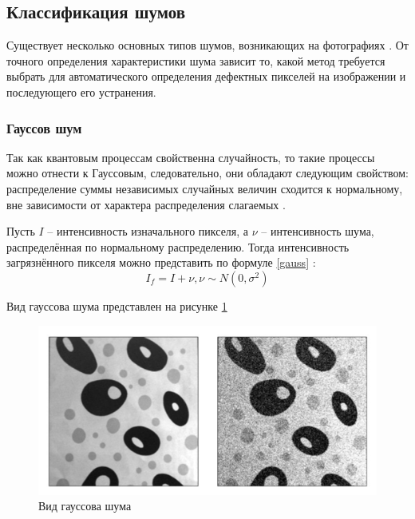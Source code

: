 \subsection{Классификация шумов}
Существует несколько основных типов шумов, возникающих на фотографиях \cite{filterTechincs}.
От точного определения характеристики шума зависит то, какой метод требуется выбрать для автоматического определения дефектных пикселей на изображении и последующего его устранения.

\subsubsection{Гауссов шум}
Так как квантовым процессам свойственна случайность, то такие процессы можно отнести к Гауссовым, следовательно, они обладают следующим свойством: распределение суммы независимых случайных величин сходится к нормальному, вне зависимости от характера распределения слагаемых \cite{inproceedings}.

Пусть $I$ -- интенсивность изначального пикселя, а $\nu$ -- интенсивность шума, распределённая по нормальному распределению. 
Тогда интенсивность загрязнённого пикселя можно представить по формуле \ref{gauss} \cite{filterTechincs}: 
\begin{equation}
	\label{gauss}
I_f = I + \nu,  \nu \sim N(0, \sigma^2)
\end{equation}


Вид гауссова шума представлен на рисунке \ref{fig::gaussSh}
\FloatBarrier
\begin{figure}[h]	
	\begin{center}
		\includegraphics[width=\linewidth]{inc/png/gaussShum.png}
	\end{center}
	\captionsetup{justification=centering}
	\caption{Вид гауссова шума}
	\label{fig::gaussSh}
\end{figure}
\FloatBarrier

